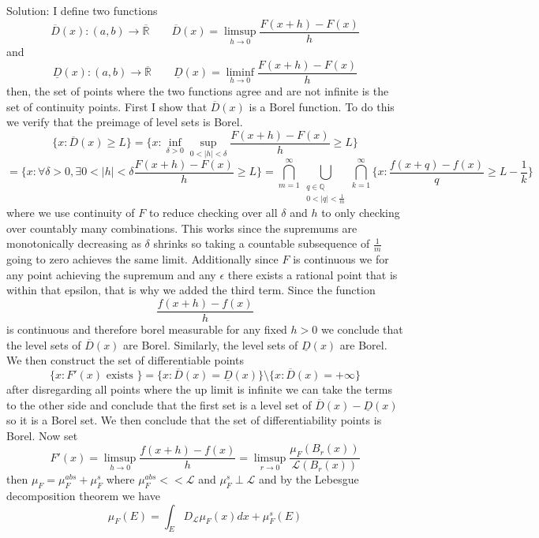 \documentclass[11pt]{article}
\newcommand{\solution}[1]{{{\textcolor{header}{Solution:} \textcolor{solution}{#1}}}}
\begin{document}
\solution{
    I define two functions
    \[
        \overline{D}(x) : (a,b) \rightarrow \overline{\mathbb{R}} \qquad \overline{D}(x) = \limsup_{h\to 0}\frac{F(x+h) - F(x)}{h}
    \] 
    and
    \[
        \underline{D}(x): (a,b) \rightarrow \overline{ \mathbb{R}} \qquad \underline{D}(x) = \liminf_{h\to 0}\frac{F(x+h) - F(x)}{h}
    \] 
    then, the set of points where the two functions agree and are not infinite is the set of continuity points. First I show that
    $\overline{D}(x)$ is a Borel function. To do this we verify that the preimage of level sets is Borel.
    \[
        \{x : \overline{D}(x) \ge L\} = \{x : \inf_{\delta > 0} \sup_{0 < |h| < \delta} \frac{F(x+h) - F(x)}{h} \ge L\}
    \] 
    \[
        = \{x : \forall \delta > 0, \exists 0 < |h| < \delta \frac{F(x+h) - F(x)}{h} \ge L\} = \bigcap_{m=1}^{\infty}\bigcup_{\substack{q\in \mathbb{Q} \\ 0 < |q| < \frac{1}{m}}}^{} \bigcap_{k=1}^{\infty} \{x : \frac{f(x+q)-f(x)}{q} \ge L - \frac{1}{k}\}
    \] 
    where we use continuity of $F$ to reduce checking over all  $\delta$ and $h$ to only checking over countably many combinations. This works since the supremums are monotonically decreasing as $\delta$ shrinks so taking a countable subsequence of $\frac{1}{m}$ going to zero achieves the same limit.
    Additionally since $F$ is continuous we for any point achieving the supremum and any  $\epsilon$ there exists a rational point that is within that epsilon, that is why we added the third term.
    Since the function 
    \[
    \frac{f(x+h)-f(x)}{h}
    \] 
    is continuous and therefore borel measurable for any fixed $h > 0$ we conclude that the level sets of $\overline{D}(x)$ are Borel. Similarly, the level sets of $\underline{D}(x)$ are Borel. We then construct the set of differentiable points
     \[
        \{x: F'(x) \text{ exists }\} = \{x : \overline{D}(x) = \underline{D}(x)\} \setminus \{x : \overline{D}(x) = +\infty\}
    \] 
    after disregarding all points where the up limit is infinite we can take the terms to the other side and conclude that the first set is a level set of $\overline{D}(x) - \underline{D}(x)$ so it is a Borel set. We then conclude that the set of differentiability points is Borel.
    Now set
    \[
    F'(x) =
    \limsup_{h\to 0} \frac{f(x+h)-f(x)}{h} = \limsup_{r\to 0} \frac{\mu_F(B_r(x))}{\mathcal{L}(B_r(x))}
    \] 
    then $\mu_F = \mu_F^{abs} + \mu_F^{s}$ where $\mu_F^{abs} << \mathcal{L}$ and $\mu_F^{s} \perp \mathcal{L}$ and by the Lebesgue decomposition theorem we have
    \[
        \mu_F(E) = \int_{E}^{}D_{\mathcal{L}}\mu_F(x)dx + \mu_F^{s}(E)
\]}
\end{document}
